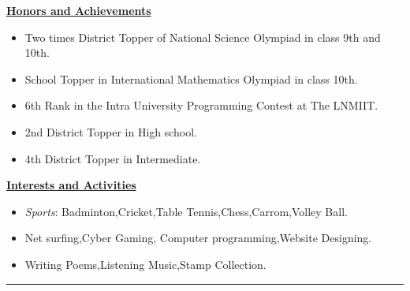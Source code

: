 \documentclass{article}
\begin{document}
\vspace{.1in}
\begin{center}\Large{\bf \underline{Honors and Achievements}}\end{center}\vspace{.1in}
\begin{itemize}
\item Two times District Topper of National Science Olympiad in class 9th and 10th.
\item School Topper in International Mathematics Olympiad in class 10th.
\item 6th Rank in the Intra University Programming Contest at The LNMIIT.
\item 2nd District Topper in High school.
\item 4th District Topper in Intermediate.
\end{itemize}
\vspace{.1in}
\begin{center}\Large{\bf \underline{Interests and Activities}}\end{center}\vspace{.1in}
\begin{itemize}
\item \emph{Sports}: Badminton,Cricket,Table Tennis,Chess,Carrom,Volley Ball.
\item Net surfing,Cyber Gaming, Computer programming,Website Designing.
\item Writing Poems,Listening Music,Stamp Collection.
\end{itemize}
\rule{\textwidth}{1pt}
\end{document}
